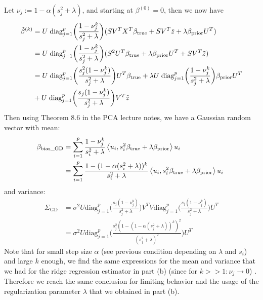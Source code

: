 \documentclass[12pt,twoside]{article}
\begin{document}
\begin{enumerate}
\begin{enumerate}
Let $\nu_j := 1 - \alpha (s_j^2 + \lambda)$, and starting at $\beta^{(0)}=0$, then we now have
\begin{align*}
	\tilde{ \beta }^{(k)} 	&= 	 U \;    \text{diag}_{j=1}^p \bigg(  \frac{ 1 - \nu_j^k} {s_j^2 + \lambda}  \bigg) (S V^T X^T  \beta_{\operatorname{true}}  + S V^T  \tilde{ z } +  \lambda \beta_{\operatorname{prior}}  U^T)\\
					&=	 U \;    \text{diag}_{j=1}^p \bigg(  \frac{ 1 - \nu_j^k} {s_j^2 + \lambda}  \bigg) (S^2 U^T  \beta_{\operatorname{true}}  +  \lambda \beta_{\operatorname{prior}}  U^T  + S V^T  \tilde{ z }) \\	
					&=	 U \;    \text{diag}_{j=1}^p \bigg(  \frac{s_j^2  (1 - \nu_j^k)} {s_j^2 + \lambda} \bigg) U^T \beta_{\operatorname{true}}  + \lambda U \;    \text{diag}_{j=1}^p \bigg(  \frac{1 - \nu_j^k} {s_j^2 + \lambda} \bigg) \beta_{\operatorname{prior}} U^T \\
					&+  	 U \;    \text{diag}_{j=1}^p \bigg(  \frac{ s_j  (1 - \nu_j^k)} {s_j^2 + \lambda} \bigg) V^T  \tilde{ z } 
\end{align*}	
 Then using Theorem 8.6 in the PCA lecture notes, we have a Gaussian random vector  with mean:
\begin{align*}
	\beta_{\text{bias\_GD}} 	&= \sum_{i=1}^p \frac{1 - \nu_j^k}{s_i^2 + \lambda} \left \langle u_i, s_i^2 \beta_{\operatorname{true}}+ \lambda  \beta_{\operatorname{prior}} \right \rangle u_i \\
						&= \sum_{i=1}^p \frac{1 - (1 - \alpha (s_i^2 + \lambda))^k} {s_i^2 + \lambda} \left \langle u_i, s_i^2 \beta_{\operatorname{true}}+ \lambda  \beta_{\operatorname{prior}} \right \rangle u_i \
\end{align*}
and variance:
\begin{align*} 
	\Sigma_{\text{GD}}			&= \sigma^2 U  \text{diag}_{j=1}^p \bigg(  \frac{ s_j  (1 - \nu_j^k)} {s_j^2 + \lambda} \bigg) V^T V  \text{diag}_{j=1}^p \bigg(  \frac{ s_j  (1 - \nu_j^k)} {s_j^2 + \lambda} \bigg) U^T \\
							&= \sigma^2 U  \text{diag}_{j=1}^p \bigg(  \frac{ s_j^2  (1 - (1 - \alpha (s_j^2 + \lambda))^k)^2} {(s_j^2 + \lambda)^2} \bigg) U^T
\end{align*}
 Note that for small step size $\alpha$ (see previous condition depending on $\lambda$ and $s_i$) and large $k$  enough, 
 we find the same expressions for the mean and variance that we had  for the ridge regression estimator in part (b) (since for $k >> 1: \nu_j \rightarrow 0$) .
 Therefore  we reach the same conclusion for limiting behavior and the usage of the regularization parameter $\lambda$ that we obtained in part (b).
 
 \end{enumerate}
 

\end{enumerate}
\end{document}
